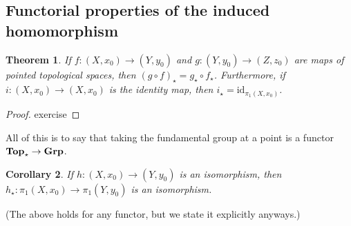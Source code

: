\documentclass[10pt, openany]{book}
\newcommand{\catname}[1]{{\normalfont\textbf{#1}}}
\theoremstyle{plain}
\newtheorem{theorem}{Theorem}[section]
\newtheorem{corollary}[theorem]{Corollary}
\theoremstyle{definition}
\theoremstyle{remark}
\begin{document}
\subsection{Functorial properties of the induced homomorphism}
\begin{theorem}
  If $f: (X,x_0)\rightarrow (Y,y_0)$ and $g: (Y,y_0)\rightarrow (Z,z_0)$ are maps of pointed topological spaces, then $(g\circ f)_{\star} = g_{\star}\circ f_{\star}$. Furthermore, if $i: (X,x_0)\rightarrow (X,x_0)$ is the identity map, then $i_{\star} = \mathrm{id}_{\pi_1(X,x_0)}$.
\end{theorem}
\begin{proof}
  exercise
\end{proof}
All of this is to say that taking the fundamental group at a point is a functor $\catname{Top}_{\star}\rightarrow \catname{Grp}$.
\begin{corollary}
  If $h: (X,x_0)\rightarrow (Y,y_0)$ is an isomorphism, then $h_{\star}: \pi_1(X,x_0)\rightarrow \pi_1(Y,y_0)$ is an isomorphism.
\end{corollary}
(The above holds for any functor, but we state it explicitly anyways.)
\end{document}
